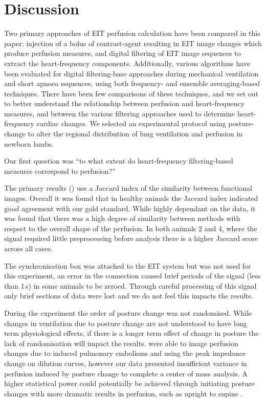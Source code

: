 \section{Discussion}                             %

Two primary approaches of EIT perfusion calculation
have been compared in this paper: injection
of a bolus of contrast-agent resulting 
in EIT image changes which produce perfusion measures, and
digital filtering of EIT image sequences to extract
the heart-frequency components.
Additionally, various algorithms have been evaluated
for digital filtering-base approaches during mechanical 
ventilation and short apnoea sequences, 
using both frequency- and ensemble averaging-based techniques.
There have been few comparisons of
these techniques, and 
we set out to better understand the relationship between
perfusion and heart-frequency measures, and between the various filtering
approaches used to determine heart-frequency cardiac changes.
We selected an experimental protocol using posture-change 
to alter the regional distribution of lung ventilation
and perfusion in newborn lambs.

Our first question was
``to what extent do heart-frequency filtering-based measures correspond to perfusion?''

The primary results () use a Jaccard index of the similarity
between functional images. Overall it was found that in healthy animals 
the Jaccard index indicated good agreement with our gold standard. While highly
dependant on the data, it was found that there was a high degree of similarity 
between methods with respect to
the overall shape of the perfusion. 
In both animals 2 and 4, where the signal required little preprocessing before analysis 
there is a higher Jaccard score across all cases.

The synchronisation box was attached to the EIT system but was not used for this experiment,
an error in the connection caused brief periods of the signal (less than 1\,s) in some animals to be zeroed.
Through careful processing of this signal only brief sections of data were lost and we do not feel this
impacts the results.

During the experiment the order of posture change was not randomised. 
While changes in ventilation due to posture change
are not understood to have long term physiological effects, if there is a longer term
effect of change in posture the lack of randomisation will impact the results. 
 were able to image perfusion changes due to induced 
pulmonary embolisms and using the peak impedance change on dilution curves,
however our data presented insufficient variance in perfusion induced by posture change to 
complete a center of mass analysis. A higher statistical power 
could potentially be achieved through initiating posture changes
with more dramatic results in perfusion, such as upright to supine \parencite{nakazato_quantitative_2010}.

